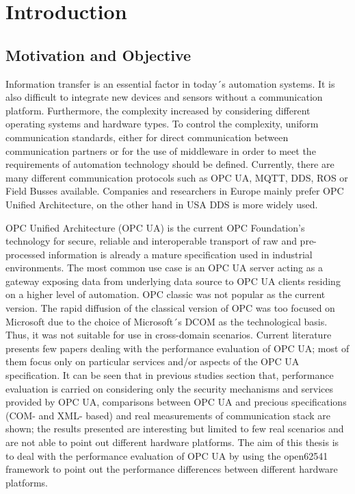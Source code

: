 
\chapter{Introduction}\label{chapter:introduction}

\section{Motivation and Objective}

Information transfer is an essential factor in today´s automation systems.  It is also difficult to integrate new devices and sensors without a communication platform. Furthermore, the complexity increased by considering different operating systems and hardware types. To control the complexity, uniform communication standards, either for direct communication between communication partners or for the use of middleware in order to meet the requirements of automation technology should be defined. Currently, there are many different communication protocols such as OPC UA, MQTT, DDS, ROS or Field Busses available. Companies and researchers in Europe mainly prefer OPC Unified Architecture, on the other hand in USA DDS is more widely used.

OPC Unified Architecture (OPC UA) is the current OPC Foundation’s technology for secure, reliable and interoperable transport of raw and pre-processed information is already a mature specification used in industrial environments. The most common use case is an OPC UA server acting as a gateway exposing data from underlying data source to OPC UA clients residing on a higher level of automation. OPC classic was not popular as the current version.  The rapid diffusion of the classical version of OPC was too focused on Microsoft due to the choice of Microsoft´s DCOM as the technological basis. Thus, it was not suitable for use in cross-domain scenarios.  
Current literature presents few papers dealing with the performance evaluation of OPC UA; most of them focus only on particular services and/or aspects of the OPC UA specification. It can be seen that in previous studies section that, performance evaluation is carried on considering only the security mechanisms and services provided by OPC UA, comparisons between OPC UA and precious specifications (COM- and XML- based) and real measurements of communication stack are shown; the results presented are interesting but limited to few real scenarios and are not able to point out different hardware platforms.
The aim of this thesis is to deal with the performance evaluation of OPC UA by using the open62541 framework to point out the performance differences between different hardware platforms.

